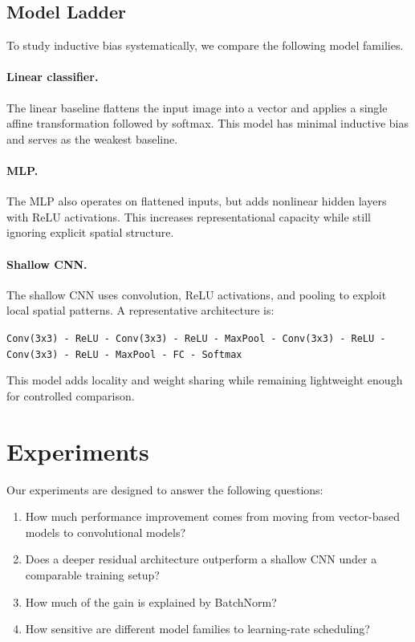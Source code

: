 \documentclass{article}
\begin{document}
\subsection{Model Ladder}
To study inductive bias systematically, we compare the following model families.

\paragraph{Linear classifier.}
The linear baseline flattens the input image into a vector and applies a single affine transformation followed by softmax. This model has minimal inductive bias and serves as the weakest baseline.

\paragraph{MLP.}
The MLP also operates on flattened inputs, but adds nonlinear hidden layers with ReLU activations. This increases representational capacity while still ignoring explicit spatial structure.

\paragraph{Shallow CNN.}
The shallow CNN uses convolution, ReLU activations, and pooling to exploit local spatial patterns. A representative architecture is:

\begin{center}
\texttt{Conv(3x3) - ReLU - Conv(3x3) - ReLU - MaxPool - Conv(3x3) - ReLU - Conv(3x3) - ReLU - MaxPool - FC - Softmax}
\end{center}

This model adds locality and weight sharing while remaining lightweight enough for controlled comparison.

\section{Experiments}

Our experiments are designed to answer the following questions:
\begin{enumerate}
    \item How much performance improvement comes from moving from vector-based models to convolutional models?
    \item Does a deeper residual architecture outperform a shallow CNN under a comparable training setup?
    \item How much of the gain is explained by BatchNorm?
    \item How sensitive are different model families to learning-rate scheduling?
\end{enumerate}
\end{document}
